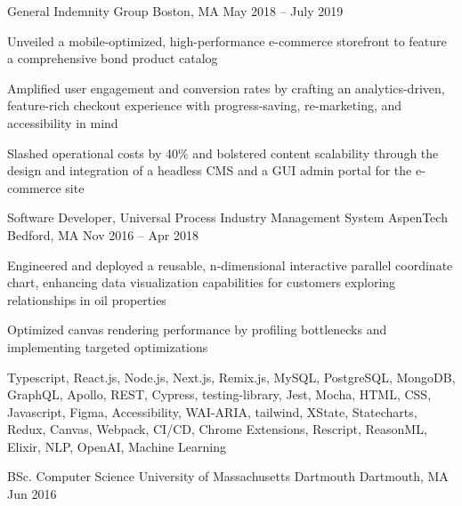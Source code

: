 \documentclass[]{awesome-cv}
\begin{document}
\begin{cventries}
	{General Indemnity Group}
	{Boston, MA}
	{May 2018 – July 2019}
	{\begin{cvitems}
		\item {Unveiled a mobile-optimized, high-performance e-commerce storefront to feature a comprehensive bond product catalog}
		\item {Amplified user engagement and conversion rates by crafting an analytics-driven, feature-rich checkout experience with progress-saving, re-marketing, and accessibility in mind}
		\item {Slashed operational costs by 40\% and bolstered content scalability through the design and integration of a headless CMS and a GUI admin portal for the e-commerce site}
		\end{cvitems}}
	\cventry
	{Software Developer, Universal Process Industry Management System} 
	{AspenTech}
	{Bedford, MA}
	{Nov 2016 – Apr 2018}
	{\begin{cvitems}
		\item {Engineered and deployed a reusable, n-dimensional interactive parallel coordinate chart, enhancing data visualization capabilities for customers exploring relationships in oil properties}
		\item {Optimized canvas rendering performance by profiling bottlenecks and implementing targeted optimizations}
		\end{cvitems}}
\end{cventries}

\vspace{-2mm}

Typescript, React.js, Node.js, Next.js, Remix.js, MySQL, PostgreSQL, MongoDB, GraphQL, Apollo, REST, Cypress, testing-library, Jest, Mocha, HTML, CSS, Javascript, Figma, Accessibility, WAI-ARIA, tailwind, XState, Statecharts, Redux, Canvas, Webpack, CI/CD, Chrome Extensions, Rescript, ReasonML, Elixir, NLP, OpenAI, Machine Learning

\begin{cvhonors}
	\cvhonor
	{BSc. Computer Science}
	{University of Massachusetts Dartmouth}
	{Dartmouth, MA}
	{Jun 2016}
\end{cvhonors}
\end{document}

